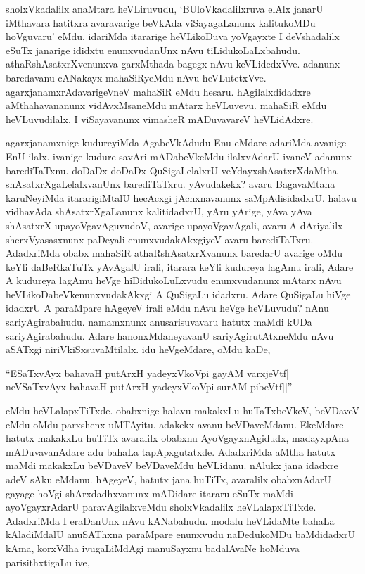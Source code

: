 sholxVkadalilx anaMtara heVLiruvudu, `BUloVkadalilxruva elAlx janarU iMthavara hatitxra avaravarige beVkAda viSayagaLanunx kalitukoMDu hoVguvaru' eMdu. idariMda itararige heVLikoDuva yoVgayxte I deVshadalilx eSuTx janarige ididxtu enunxvudanUnx nAvu tiLidukoLaLxbahudu. athaRshAsatxrXvenunxva garxMthada bagegx nAvu keVLidedxVve. adanunx baredavanu cANakayx mahaSiRyeMdu nAvu heVLutetxVve. agarxjanamxrAdavarigeVneV mahaSiR eMdu hesaru. hAgilalxdidadxre aMthahavananunx vidAvxMsaneMdu mAtarx heVLuvevu. mahaSiR eMdu heVLuvudilalx. I viSayavanunx vimasheR mADuvavareV heVLidAdxre.

agarxjanamxnige kudureyiMda AgabeVkAdudu Enu eMdare adariMda avanige EnU ilalx. ivanige kudure savAri mADabeVkeMdu ilalxvAdarU ivaneV adanunx barediTaTxnu. doDaDx doDaDx QuSigaLelalxrU veYdayxshAsatxrXdaMtha shAsatxrXgaLelalxvanUnx barediTaTxru. yAvudakekx? avaru BagavaMtana karuNeyiMda itararigiMtalU hecAcxgi jAcnxnavanunx saMpAdisidadxrU. halavu vidhavAda shAsatxrXgaLanunx kalitidadxrU, yAru yArige, yAva yAva shAsatxrX upayoVgavAguvudoV, avarige upayoVgavAgali, avaru A dAriyalilx sherxVyasasxnunx paDeyali enunxvudakAkxgiyeV avaru barediTaTxru. AdadxriMda obabx mahaSiR athaRshAsatxrXvanunx baredarU avarige oMdu keYli daBeRkaTuTx yAvAgalU irali, itarara keYli kudureya lagAmu irali, Adare A kudureya lagAmu heVge hiDidukoLuLxvudu enunxvudanunx mAtarx nAvu heVLikoDabeVkenunxvudakAkxgi A QuSigaLu idadxru. Adare QuSigaLu hiVge idadxrU A paraMpare hAgeyeV irali eMdu nAvu heVge heVLuvudu? nAnu sariyAgirabahudu. namamxnunx anusarisuvavaru hatutx maMdi kUDa sariyAgirabahudu. Adare hanonxMdaneyavanU sariyAgirutAtxneMdu nAvu aSATxgi niriVkiSxsuvaMtilalx. idu heVgeMdare, oMdu kaDe, 

\begin{shloka}
``ESaTxvAyx bahavaH putArxH yadeyxVkoV\s pi gayAM varxjeVtf|\\
neVSaTxvAyx bahavaH putArxH yadeyxVkoV\s pi surAM pibeVtf||''
\end{shloka}

\noindent eMdu heVLalapxTiTxde. obabxnige halavu makakxLu huTaTxbeVkeV, beVDaveV eMdu oMdu parxshenx uMTAyitu. adakekx avanu beVDaveMdanu. EkeMdare hatutx makakxLu huTiTx avaralilx obabxnu AyoVgayxnAgidudx, madayxpAna mADuvavanAdare adu bahaLa tapApxgutatxde. AdadxriMda aMtha hatutx maMdi makakxLu beVDaveV beVDaveMdu heVLidanu. nAlukx jana idadxre adeV sAku eMdanu. hAgeyeV, hatutx jana huTiTx, avaralilx obabxnAdarU gayage hoVgi shArxdadhxvanunx mADidare itararu eSuTx maMdi ayoVgayxrAdarU paravAgilalxveMdu sholxVkadalilx heVLalapxTiTxde. AdadxriMda I eraDanUnx nAvu kANabahudu. modalu heVLidaMte bahaLa kAladiMdalU anuSAThxna paraMpare enunxvudu naDedukoMDu baMdidadxrU kAma, korxVdha ivugaLiMdAgi manuSayxnu badalAvaNe hoMduva parisithxtigaLu ive,

